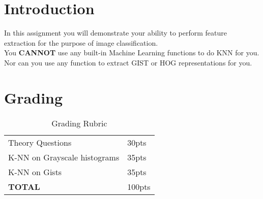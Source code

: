 \documentclass[12pt]{article}
\begin{document}
\maketitle


\section*{Introduction}
In this assignment you will demonstrate your ability to perform feature extraction for the purpose of image classification.\\

\noindent
You \textbf{CANNOT} use any built-in Machine Learning functions to do KNN for you.  Nor can you use any function to extract GIST or HOG representations for you.  


\section*{Grading}
\begin{table}[h]
\begin{centering}
\begin{tabular}{|l|l|}
\hline
Theory Questions & 30pts \\
K-NN on Grayscale histograms & 35pts\\
K-NN on Gists & 35pts \\
\hline
\textbf{TOTAL} & 100pts\\
\hline
\end{tabular}
\caption{Grading Rubric}
\end{centering}
\end{table}

\newpage
\end{document}
